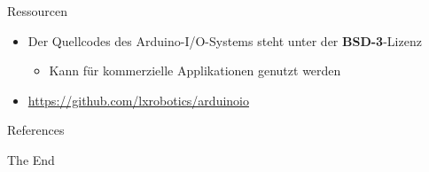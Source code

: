 \documentclass{beamer}
\begin{document}
\begin{frame}{Ressourcen}
\begin{itemize}
 \item Der Quellcodes des Arduino-I/O-Systems steht unter der \textbf{BSD-3}-Lizenz
 \begin{itemize}
  \item Kann f\"ur kommerzielle Applikationen genutzt werden
 \end{itemize}
\end{itemize}
\begin{itemize}
 \item \url{https://github.com/lxrobotics/arduinoio}
\end{itemize}
\end{frame}
\begin{frame}[allowframebreaks]{References}
\scriptsize{}
\end{frame}
\begin{frame}
\Huge{\centerline{The End}}
\end{frame}
\end{document}
